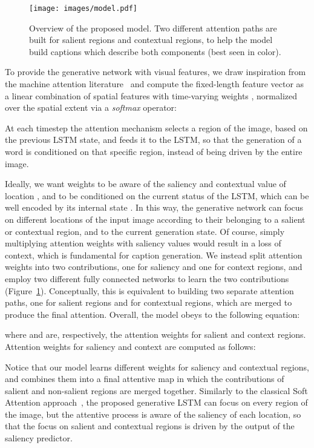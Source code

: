 \begin{figure}[t!]
\centering
	\texttt{[image: images/model.pdf]}
\caption{Overview of the proposed model. Two different attention paths are built for salient regions and contextual regions, to help the model build captions which describe both components (best seen in color).}
\label{fig:model}
\end{figure}

To provide the generative network with visual features, we draw inspiration from the machine attention literature~\cite{icml2015xuc15} and compute the fixed-length feature vector  as a linear combination of spatial features  with time-varying weights , normalized over the spatial extent via a \textit{softmax} operator:

At each timestep the attention mechanism selects a region of the image, based on the previous LSTM state, and feeds it to the LSTM, so that the generation of a word is conditioned on that specific region, instead of being driven by the entire image.

Ideally, we want weights  to be aware of the saliency and contextual value of location , and to be conditioned on the current status of the LSTM, which can be well encoded by its internal state . In this way, the generative network can focus on different locations of the input image according to their belonging to a salient or contextual region, and to the current generation state. Of course, simply multiplying attention weights with saliency values would result in a loss of context, which is fundamental for caption generation. We instead split attention weights  into two contributions, one for saliency and one for context regions, and employ two different fully connected networks to learn the two contributions (Figure~\ref{fig:model}). Conceptually, this is equivalent to building two separate attention paths, one for salient regions and for contextual regions, which are merged to produce the final attention. Overall, the model obeys to the following equation:

where  and  are, respectively, the attention weights for salient and context regions. Attention weights for saliency and context are computed as follows:

Notice that our model learns different weights for saliency and contextual regions, and combines them into a final attentive map in which the contributions of salient and non-salient regions are merged together. Similarly to the classical Soft Attention approach~\cite{icml2015xuc15}, the proposed generative LSTM can focus on every region of the image, but the attentive process is aware of the saliency of each location, so that the focus on salient and contextual regions is driven by the output of the saliency predictor.

